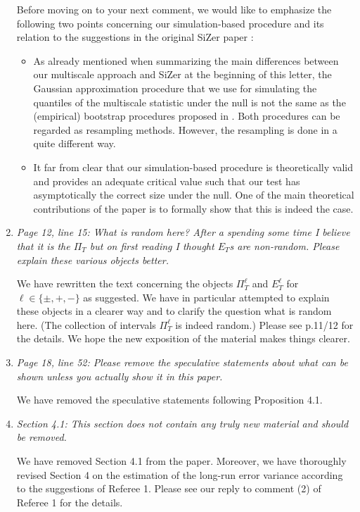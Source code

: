 \documentclass[a4paper,12pt]{article}
\begin{document}
\begin{enumerate}[label=(\arabic*),leftmargin=0.7cm]
Before moving on to your next comment, we would like to emphasize the following two points concerning our simulation-based procedure and its relation to the suggestions in the original SiZer paper \citep{ChaudhuriMarron1999}: 
\begin{itemize}[leftmargin=0.5cm]
\item As already mentioned when summarizing the main differences between our multiscale approach and SiZer at the beginning of this letter, the Gaussian approximation procedure that we use for simulating the quantiles of the multiscale statistic under the null is not the same as the (empirical) bootstrap procedures proposed in \cite{ChaudhuriMarron1999, ChaudhuriMarron2000}. Both procedures can be regarded as resampling methods. However, the resampling is done in a quite different way. 
\item It far from clear that our simulation-based procedure is theoretically valid and provides an adequate critical value such that our test has asymptotically the correct size under the null. One of the main theoretical contributions of the paper is to formally show that this is indeed the case. 
\end{itemize}


\item \textit{Page 12, line 15: What is random here? After a spending some time I believe that it is the $\Pi_T$ but on first reading I thought $E_T$s are non-random. Please explain these various objects better.}

We have rewritten the text concerning the objects $\Pi_T^\ell$ and $E_T^\ell$ for $\ell \in \{\pm,+,-\}$ as suggested. We have in particular attempted to explain these objects in a clearer way and to clarify the question what is random here. (The collection of intervals $\Pi_T^\ell$ is indeed random.) Please see p.11/12 for the details. We hope the new exposition of the material makes things clearer.  


\item \textit{Page 18, line 52: Please remove the speculative statements about what can be shown unless you actually show it in this paper.}

We have removed the speculative statements following Proposition 4.1.


\item \textit{Section 4.1: This section does not contain any truly new material and should be removed.}

We have removed Section 4.1 from the paper. Moreover, we have thoroughly revised Section 4 on the estimation of the long-run error variance according to the suggestions of Referee 1. Please see our reply to comment (2) of Referee 1 for the details. 



\end{enumerate}
\end{document}

